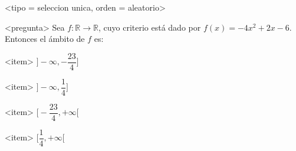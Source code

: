 <tipo = seleccion unica, orden = aleatorio>

<pregunta>
Sea $f:\mathbb R \to \mathbb R$, cuyo criterio est\'a dado por $f(x) = -4x^2 +2x -6$. Entonces el \'ambito de $f$ es:


<item>
$\bigg]{-}\infty, -\dfrac{23}{4}\bigg]$

<item>
$\bigg]{-}\infty, \dfrac{1}{4}\bigg]$

<item>
$\bigg[-\dfrac{23}{4}, +\infty\bigg[$

<item>
$\bigg[\dfrac{1}{4}, +\infty\bigg[$



